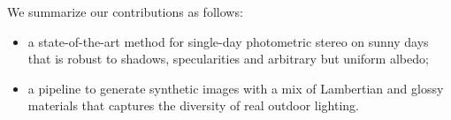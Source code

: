 

We summarize our contributions as follows:
\begin{itemize}[noitemsep,nolistsep]
	\item a state-of-the-art method for single-day photometric stereo on sunny days that is robust to shadows, specularities and arbitrary but uniform albedo;
    \item a pipeline to generate synthetic images with a mix of Lambertian and glossy materials that captures the diversity of real outdoor lighting.
\end{itemize}



